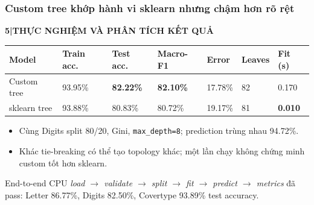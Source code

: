 \documentclass[aspectratio=169,12pt]{beamer}
\newcommand{\chaptertag}[2]{%
  \vspace{-0.16cm}%
  {\scriptsize\bfseries\textcolor{boxframe}{#1\enspace |\enspace #2}}\par
  \vspace{0.12cm}%
}
\begin{document}
\begin{frame}
  \frametitle{Custom tree khớp hành vi sklearn nhưng chậm hơn rõ rệt}
  \chaptertag{5}{THỰC NGHIỆM VÀ PHÂN TÍCH KẾT QUẢ}
  \scriptsize
  \begin{tabularx}{\textwidth}{@{}L{2.2cm}C{1.45cm}C{1.45cm}C{1.45cm}C{1.35cm}C{1.15cm}C{1.3cm}@{}}
    \toprule
    \textbf{Model} & \textbf{Train acc.} & \textbf{Test acc.} & \textbf{Macro-F1} & \textbf{Error} & \textbf{Leaves} & \textbf{Fit (s)} \\
    \midrule
    Custom tree & 93.95\% & \textbf{82.22\%} & \textbf{82.10\%} & 17.78\% & 82 & 0.170 \\
    sklearn tree & 93.88\% & 80.83\% & 80.72\% & 19.17\% & 81 & \textbf{0.010} \\
    \bottomrule
  \end{tabularx}
  \par\vspace{0.22cm}
  \small
  \begin{itemize}
    \item Cùng Digits split 80/20, Gini, \texttt{max\_depth=8}; prediction trùng nhau 94.72\%.
    \item Khác tie-breaking có thể tạo topology khác; một lần chạy không chứng minh custom tốt hơn sklearn.
  \end{itemize}
  \vspace{0.12cm}
  \begin{tcolorbox}[focusbox,width=0.95\textwidth,top=1.5mm,bottom=1.5mm]
    \centering\small
    End-to-end CPU \textit{load $\rightarrow$ validate $\rightarrow$ split $\rightarrow$ fit $\rightarrow$ predict $\rightarrow$ metrics} đã pass: Letter 86.77\%, Digits 82.50\%, Covertype 93.89\% test accuracy.
  \end{tcolorbox}
\end{frame}
\end{document}
